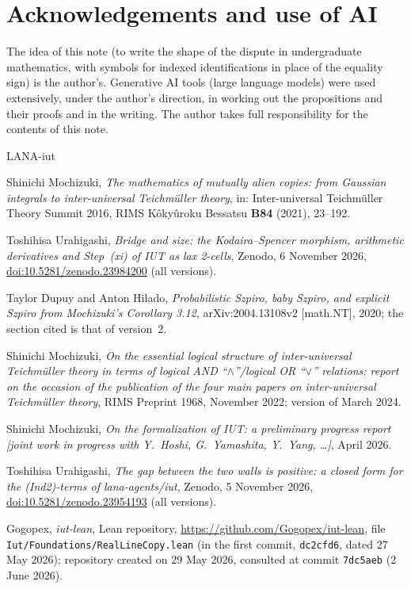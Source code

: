 \documentclass[11pt,a4paper]{article}
\theoremstyle{plain}
\theoremstyle{definition}
\theoremstyle{remark}
\begin{document}
\section*{Acknowledgements and use of AI}
The idea of this note (to write the shape of the dispute in undergraduate mathematics, with symbols for indexed
identifications in place of the equality sign) is the author's. Generative AI tools (large language models) were used
extensively, under the author's direction, in working out the propositions and their proofs and in the writing. The author
takes full responsibility for the contents of this note.

\begin{thebibliography}{LANA-iut}\raggedright
{}
Shinichi Mochizuki, \emph{The mathematics of mutually alien copies: from {G}aussian integrals to inter-universal
{T}eichm\"uller theory}, in: Inter-universal Teichm\"uller Theory Summit 2016, RIMS K\^oky\^uroku Bessatsu \textbf{B84}
(2021), 23--192.

Toshihisa Urahigashi, \emph{Bridge and size: the {K}odaira--{S}pencer morphism, arithmetic derivatives and {S}tep~(xi)
of {IUT} as lax 2-cells}, Zenodo, 6 November 2026,
\href{https://doi.org/10.5281/zenodo.23984200}{doi:10.5281/zenodo.23984200} (all versions).

Taylor Dupuy and Anton Hilado, \emph{Probabilistic {S}zpiro, baby {S}zpiro, and explicit {S}zpiro from {M}ochizuki's
{C}orollary 3.12}, arXiv:2004.13108v2 [math.NT], 2020; the section cited is that of version~2.

Shinichi Mochizuki, \emph{On the essential logical structure of inter-universal {T}eichm\"uller theory in terms of
logical {AND} ``$\wedge$''/logical {OR} ``$\vee$'' relations: report on the occasion of the publication of the four main
papers on inter-universal {T}eichm\"uller theory}, RIMS Preprint 1968, November 2022; version of March 2024.

Shinichi Mochizuki, \emph{On the formalization of {IUT}: a preliminary progress report [joint work in progress with
{Y.~Hoshi}, {G.~Yamashita}, {Y.~Yang}, \dots]}, April 2026.

Toshihisa Urahigashi, \emph{The gap between the two walls is positive: a closed form for the (Ind2)-terms of
lana-agents/iut}, Zenodo, 5 November 2026,
\href{https://doi.org/10.5281/zenodo.23954193}{doi:10.5281/zenodo.23954193} (all versions).

Gogopex, \emph{iut-lean}, Lean repository, \url{https://github.com/Gogopex/iut-lean}, file
\texttt{Iut/Foundations/RealLineCopy.lean} (in the first commit, \texttt{dc2cfd6}, dated 27 May 2026); repository
created on 29 May 2026, consulted at commit \texttt{7dc5aeb} (2 June 2026).


\end{thebibliography}
\end{document}
